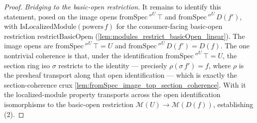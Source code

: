 \begin{proof}
  \emph{Bridging to the basic-open restriction.} It remains to identify this
  statement, posed on the image opens \(\mathrm{fromSpec}\,''^{U}\,\top\) and
  \(\mathrm{fromSpec}\,''^{U}\,D(f')\), with
  \(\mathrm{IsLocalizedModule}(\mathrm{powers}\,f)\) for the consumer-facing
  basic-open restriction \(\mathrm{restrictBasicOpenₗ}\)
  (\cref{lem:modules_restrict_basicOpen_linear}). The image opens are
  \(\mathrm{fromSpec}\,''^{U}\,\top = U\) and
  \(\mathrm{fromSpec}\,''^{U}\,D(f') = D(f)\). The one nontrivial coherence is that,
  under the identification \(\mathrm{fromSpec}\,''^{U}\,\top = U\), the section ring
  iso \(\sigma\) restricts to the identity --- precisely \(\rho(\sigma\,f') = f\),
  where \(\rho\) is the presheaf transport along that open identification --- which
  is exactly the section-coherence crux
  \cref{lem:fromSpec_image_top_section_coherence}. With it the localized-module
  property transports across the open identification isomorphisms to the
  basic-open restriction \(\mathcal{M}(U) \to \mathcal{M}(D(f))\), establishing (2).
\end{proof}

